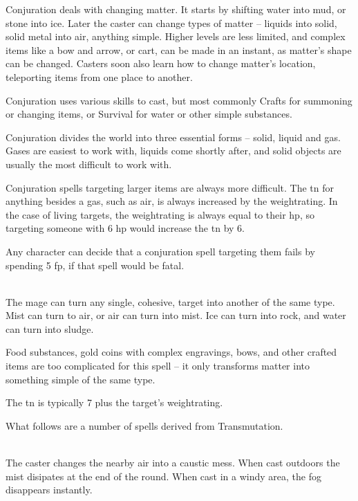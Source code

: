 \begin{multicols}{2}

\noindent
Conjuration deals with changing matter.
It starts by shifting water into mud, or stone into ice.  Later the caster can change types of matter -- liquids into solid, solid metal into air, anything simple.
Higher levels are less limited, and complex items like a bow and arrow, or cart, can be made in an instant, as matter's shape can be changed.  Casters soon also learn how to change matter's location, teleporting items from one place to another.

Conjuration uses various skills to cast, but most commonly Crafts for summoning or changing items, or Survival for water or other simple substances.

Conjuration divides the world into three essential forms -- solid, liquid and gas.  Gases are easiest to work with, liquids come shortly after, and solid objects are usually the most difficult to work with.

Conjuration spells targeting larger items are always more difficult.  The \gls{tn} for anything besides a gas, such as air, is always increased by the \gls{weightrating}.
In the case of living targets, the \gls{weightrating} is always equal to their \gls{hp}, so targeting someone with 6 \gls{hp} would increase the \gls{tn} by 6.

Any character can decide that a conjuration spell targeting them fails by spending 5 \gls{fp}, if that spell would be fatal.

\spelllevel

\\
The mage can turn any single, cohesive, target into another of the same type.  Mist can turn to air, or air can turn into mist.
Ice can turn into rock, and water can turn into sludge.

Food substances, gold coins with complex engravings, bows, and other crafted items are too complicated for this spell -- it only transforms matter into something simple of the same type.

The \gls{tn} is typically 7 plus the target's \gls{weightrating}.

What follows are a number of spells derived from Transmutation.

\\
The caster changes the nearby air into a caustic mess.  When cast outdoors the mist disipates at the end of the \gls{round}.  When cast in a windy area, the fog disappears instantly.


\end{multicols}

